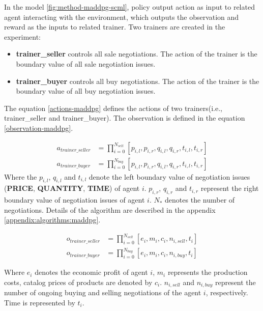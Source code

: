 In the model \ref{fig:method-maddpg-scml}, policy output action as input to related agent interacting with the environment, which outputs the observation and reward as the inputs to related trainer. Two trainers are created in the experiment:
\begin{itemize}
\item \textbf{trainer\_seller} controls all sale negotiations. The action of the trainer is the boundary value of all sale negotiation issues.
\item \textbf{trainer\_buyer} controls all buy negotiations. The action of the trainer is the boundary value of all buy negotiation issues.
\end{itemize}

The equation \ref{actions-maddpg} defines the actions of two trainers(i.e., trainer\_seller and trainer\_buyer). The observation is defined in the equation \ref{observation-maddpg}.

\begin{equation} \label{actions-maddpg}
\begin{aligned}
a_{trainer\_seller} & = \prod_{i=0}^{N_{sell}}[p_{i, l}, p_{i, r}, q_{i, l}, q_{i, r}, t_{i, l}, t_{i, r}] \\
a_{trainer\_buyer} & = \prod_{i=0}^{N_{buy}}[p_{i, l}, p_{i, r}, q_{i, l}, q_{i, r}, t_{i, l}, t_{i, r}]
\end{aligned}
\end{equation}
Where the $p_{i, l}$, $q_{i, l}$ and $t_{i, l}$ denote the left boundary value of negotiation issues (\textbf{PRICE}, \textbf{QUANTITY}, \textbf{TIME}) of agent $i$. $p_{i, r}$, $q_{i, r}$ and $t_{i, r}$ represent the right boundary value of negotiation issues of agent $i$. $N_{*}$ denotes the number of negotiations. Details of the algorithm are described in the appendix \ref{appendix:algorithms:maddpg}.  

\begin{equation} \label{observation-maddpg}
\begin{aligned}
o_{trainer\_seller} &= \prod_{i=0}^{N_{sell}}[e_{i}, m_{i}, c_{i}, n_{i, sell}, t_{i}] \\
o_{trainer\_buyer} &= \prod_{i=0}^{N_{buy}}[e_{i}, m_{i}, c_{i}, n_{i, buy}, t_{i}]
\end{aligned} 
\end{equation}

Where $e_{i}$ denotes the economic profit of agent $i$, $m_{i}$ represents the production costs, catalog prices of products are denoted by $c_{i}$. $n_{i, sell}$ and $n_{i, buy}$ represent the number of ongoing buying and selling negotiations of the agent $i$, respectively. Time is represented by $t_{i}$. 

